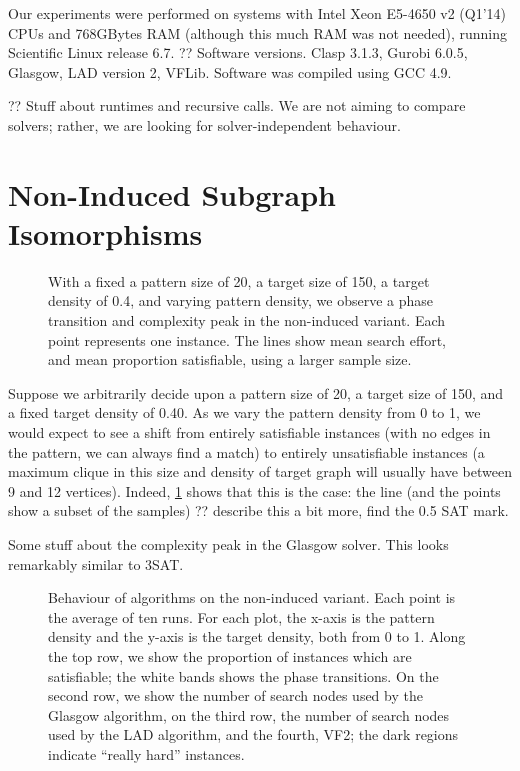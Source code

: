 \documentclass[letterpaper]{article}
\begin{document}
Our experiments were performed on systems with Intel Xeon E5-4650 v2 (Q1'14) CPUs and 768GBytes RAM
(although this much RAM was not needed), running Scientific Linux release 6.7.   ?? Software
versions. Clasp 3.1.3, Gurobi 6.0.5, Glasgow, LAD version 2, VFLib. Software was compiled using GCC
4.9.

?? Stuff about runtimes and recursive calls. We are not aiming to compare solvers; rather, we are
looking for solver-independent behaviour.

\section{Non-Induced Subgraph Isomorphisms}

\begin{figure}[t]
    
    \caption{With a fixed a pattern size of 20, a target size of 150, a target density of 0.4, and
    varying pattern density, we observe a phase transition and complexity peak in the non-induced
    variant. Each point represents one instance. The lines show mean search effort, and mean
    proportion satisfiable, using a larger sample size.}
    \label{figure:phase-transition}
\end{figure}

Suppose we arbitrarily decide upon a pattern size of 20, a target size of 150, and a fixed target
density of 0.40. As we vary the pattern density from 0 to 1, we would expect to see a shift from
entirely satisfiable instances (with no edges in the pattern, we can always find a match) to
entirely unsatisfiable instances (a maximum clique in this size and density of target graph will
usually have between 9 and 12 vertices). Indeed, \cref{figure:phase-transition} shows that this is
the case: the line (and the points show a subset of the samples) ?? describe this a bit more, find
the 0.5 SAT mark.

Some stuff about the complexity peak in the Glasgow solver. This looks remarkably similar to 3SAT.

\begin{figure}[tb]
    
    \caption{Behaviour of algorithms on the non-induced variant. Each point is the average of ten
        runs. For each plot, the x-axis is the pattern density and the y-axis is the target
        density, both from 0 to 1. Along the top row, we show the proportion of instances which are
        satisfiable; the white bands shows the phase transitions. On the second row, we show the
        number of search nodes used by the Glasgow algorithm, on the third row, the number of
        search nodes used by the LAD algorithm, and the fourth, VF2; the dark regions indicate
        ``really hard'' instances.}
    \label{figure:non-induced}
\end{figure}
\end{document}
